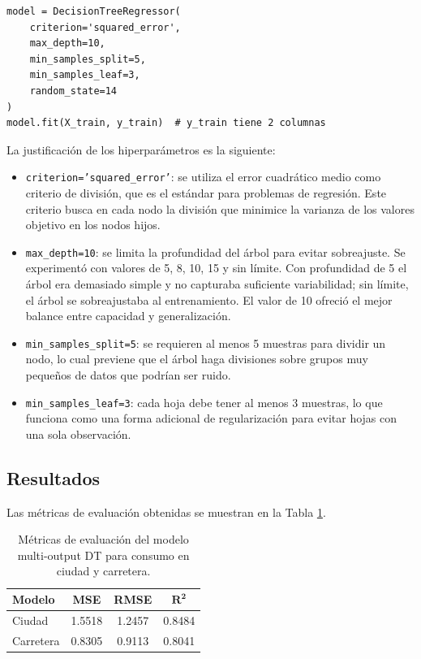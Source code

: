 \documentclass{article}
\begin{document}
\begin{lstlisting}
model = DecisionTreeRegressor(
    criterion='squared_error',
    max_depth=10,
    min_samples_split=5,
    min_samples_leaf=3,
    random_state=14
)
model.fit(X_train, y_train)  # y_train tiene 2 columnas
\end{lstlisting}

La justificación de los hiperparámetros es la siguiente:

\begin{itemize}
    \item \texttt{criterion='squared\_error'}: se utiliza el error cuadrático medio como criterio de división, que es el estándar para problemas de regresión. Este criterio busca en cada nodo la división que minimice la varianza de los valores objetivo en los nodos hijos.
    \item \texttt{max\_depth=10}: se limita la profundidad del árbol para evitar sobreajuste. Se experimentó con valores de 5, 8, 10, 15 y sin límite. Con profundidad de 5 el árbol era demasiado simple y no capturaba suficiente variabilidad; sin límite, el árbol se sobreajustaba al entrenamiento. El valor de 10 ofreció el mejor balance entre capacidad y generalización.
    \item \texttt{min\_samples\_split=5}: se requieren al menos 5 muestras para dividir un nodo, lo cual previene que el árbol haga divisiones sobre grupos muy pequeños de datos que podrían ser ruido.
    \item \texttt{min\_samples\_leaf=3}: cada hoja debe tener al menos 3 muestras, lo que funciona como una forma adicional de regularización para evitar hojas con una sola observación.
\end{itemize}

\subsection{Resultados}

Las métricas de evaluación obtenidas se muestran en la Tabla \ref{tab:p3_resultados}.

\begin{table}[H]
\centering
\begin{tabular}{lccc}
\hline
\textbf{Modelo} & \textbf{MSE} & \textbf{RMSE} & $\mathbf{R^2}$ \\
\hline
Ciudad    & 1.5518 & 1.2457 & 0.8484 \\
Carretera & 0.8305 & 0.9113 & 0.8041 \\
\hline
\end{tabular}
\caption{Métricas de evaluación del modelo multi-output DT para consumo en ciudad y carretera.}
\label{tab:p3_resultados}
\end{table}
\end{document}
